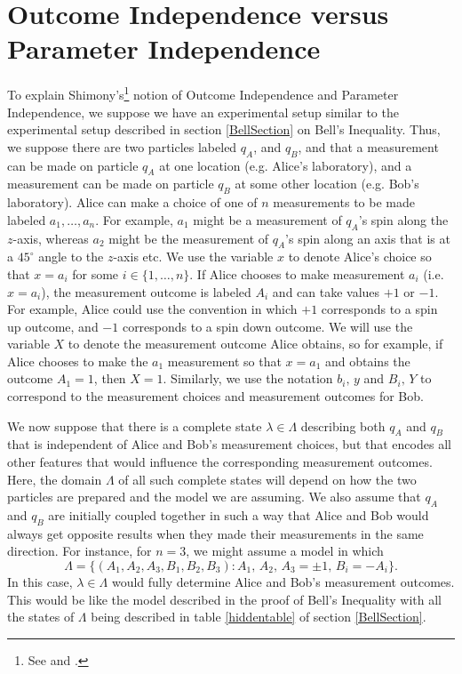 
\section{Outcome Independence versus Parameter Independence}
To explain Shimony's\footnote{See \cite[146-147]{Shimony86} and \cite[7-9]{Butterfield}.}  notion of  Outcome Independence and Parameter Independence, we suppose we have an experimental setup similar to the experimental setup described in section \ref{BellSection} on Bell's Inequality. Thus, we suppose there are two particles labeled $q_A$, and $q_B$, and that a measurement can be made on particle  $q_A$ at one location (e.g. Alice's laboratory), and a measurement can be made on particle $q_B$ at some other location (e.g. Bob's laboratory). Alice can make a choice of one of $n$ measurements to be made labeled $a_1,\ldots, a_n$. For example, $a_1$ might be a measurement of $q_A$'s spin along the $z$-axis, whereas $a_2$ might be the measurement of $q_A$'s spin along an axis that is at  a $45^\circ$ angle to the $z$-axis etc. We use the variable $x$ to denote Alice's choice so that $x=a_i$ for some $i\in\{1,\ldots,n\}$. If Alice chooses to make measurement $a_i$ (i.e. $x=a_i$), the measurement outcome is labeled $A_i$ and can take values $+1$ or $-1$. For example, Alice could use the convention in which $+1$ corresponds to a spin up outcome, and $-1$ corresponds to a spin down outcome. We will use the variable $X$ to denote the measurement outcome Alice obtains, so for example, if Alice chooses to make the $a_1$ measurement so that $x=a_1$ and obtains the outcome $A_1=1$, then $X=1$. Similarly, we use the notation $b_i,\, y$ and $B_i,\, Y$ to correspond to the measurement choices and measurement outcomes for Bob.

We now suppose that there is a complete state $\lambda\in\Lambda$ describing both $q_A$ and $q_B$ that is independent of Alice and Bob's measurement choices, but that encodes all other features that would influence the corresponding measurement outcomes. Here, the domain $\Lambda$ of all such complete states will depend on how the two particles are prepared and the model we are assuming. We also assume that  $q_A$ and $q_B$ are initially coupled together in such a way that Alice and Bob would always get opposite results when they made their measurements in the same direction. For instance, for $n=3$, we might assume a model in which 
\begin{equation}\label{bellLambda}
\Lambda=\big\{(A_1, A_2, A_3 ,B_1, B_2, B_3):A_1,\, A_2,\, A_3=\pm1,\, B_i=-A_i\big\}.
\end{equation}
 In this case, $\lambda\in\Lambda$ would fully determine Alice and Bob's measurement outcomes. This would be like the model described in the proof of Bell's Inequality with all the states of $\Lambda$ being described in table \ref{hiddentable} of section \ref{BellSection}. 
 

